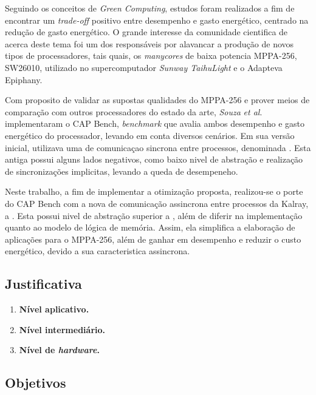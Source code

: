 \documentclass[a4paper,11pt]{article}
\newcommand{\etal}{\textit{et al}.\xspace}
\newcommand{\mppa}{MPPA-256\xspace}
\newcommand{\capb}{CAP Bench\xspace}
\newcommand{\epiphany}{Adapteva Epiphany\xspace}
\begin{document}
Seguindo os conceitos de \textit{Green Computing}, estudos foram realizados a fim de encontrar um \textit{trade-off} positivo entre desempenho e gasto energético, centrado na redução de gasto energético. O grande interesse da comunidade cientifica de \hpc acerca deste tema foi um dos responsáveis por alavancar a produção de novos tipos de processadores, tais quais, os \textit{manycores} de baixa potencia \mppa \cite{MPPA-2:2013}, SW26010, utilizado no supercomputador \textit{Sunway TaihuLight} \cite{sunway:2016} e o \epiphany  \cite{Olofsson2014}.

Com proposito de validar as supostas qualidades do \mppa e prover meios de comparação com outros processadores do estado da arte, \textit{Souza} \etal implementaram o \capb \cite{Castro-Souza-CCPE:2016}, \textit{benchmark} que avalia ambos desempenho e gasto energético do processador, levando em conta diversos cenários. Em sua versão inicial, utilizava uma \api de comunicaçao sincrona entre processos, denominada \ipc \cite{MPPA-2:2013}. Esta antiga \api possui alguns lados negativos, como baixo nivel de abstração e realização de sincronizações implicitas, levando a queda de desempeneho.

Neste trabalho, a fim de implementar a otimização proposta, realizou-se o porte do \capb com a nova \api de comunicação assincrona entre processos da Kalray, a \async \cite{Hascoet2017}. Esta \api possui nivel de abstração superior a \ipc, além de diferir na implementação quanto ao modelo de lógica de memória. Assim, ela simplifica a elaboração de aplicações para o \mppa, além de ganhar em desempenho e reduzir o custo energético, devido a sua caracteristica assincrona.



\subsection{Justificativa}

\begin{enumerate}

	\item \textbf{Nível aplicativo.}
		
	\item \textbf{Nível intermediário.}
	
	\item \textbf{Nível de \emph{hardware}.} 
	
\end{enumerate}

\subsection{Objetivos}
\end{document}
